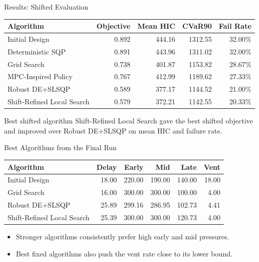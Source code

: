 \documentclass[aspectratio=169]{beamer}
\begin{document}
\begin{frame}{Results: Shifted Evaluation}
  \begin{table}
    \centering
    \scriptsize
    \begin{tabular}{lrrrr}
      \toprule
      Algorithm & Objective & Mean HIC & CVaR90 & Fail Rate \\
      \midrule
      Initial Design & 0.892 & 444.16 & 1312.55 & 32.00\% \\
      Deterministic SQP & 0.891 & 443.96 & 1311.02 & 32.00\% \\
      Grid Search & 0.738 & 401.87 & 1153.82 & 28.67\% \\
      MPC-Inspired Policy & 0.767 & 412.99 & 1189.62 & 27.33\% \\
      Robust DE+SLSQP & 0.589 & 377.17 & 1144.52 & 21.00\% \\
      Shift-Refined Local Search & 0.579 & 372.21 & 1142.55 & 20.33\% \\
      \bottomrule
    \end{tabular}
  \end{table}

  \vspace{0.3em}
  \begin{block}{Best shifted algorithm}
    Shift-Refined Local Search gave the best shifted objective and improved over Robust DE+SLSQP on mean HIC and failure rate.
  \end{block}
\end{frame}

\begin{frame}{Best Algorithms from the Final Run}
  \begin{table}
    \centering
    \small
    \begin{tabular}{lrrrrr}
      \toprule
      Algorithm & Delay & Early & Mid & Late & Vent \\
      \midrule
      Initial Design & 18.00 & 220.00 & 190.00 & 140.00 & 18.00 \\
      Grid Search & 16.00 & 300.00 & 300.00 & 100.00 & 4.00 \\
      Robust DE+SLSQP & 25.89 & 299.16 & 286.95 & 102.73 & 4.41 \\
      Shift-Refined Local Search & 25.39 & 300.00 & 300.00 & 120.73 & 4.00 \\
      \bottomrule
    \end{tabular}
  \end{table}

  \vspace{0.4em}
  \begin{itemize}
    \item Stronger algorithms consistently prefer high early and mid pressures.
    \item Best fixed algorithms also push the vent rate close to its lower bound.
  \end{itemize}
\end{frame}
\end{document}
